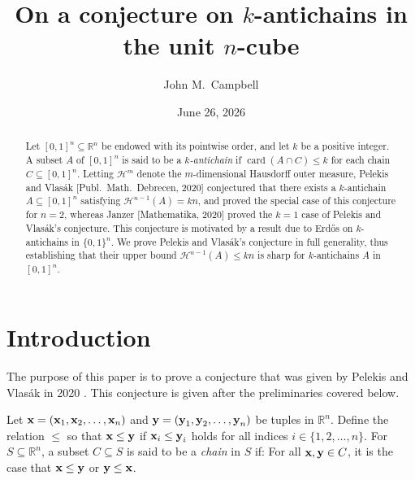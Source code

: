 \documentclass{publicadapt}
\title{On a conjecture on $k$-antichains in the unit $n$-cube}
\author{John M.\ Campbell}
\date{June 26, 2026}
\begin{document}
 \begin{abstract}
 Let $[0, 1]^{n} \subseteq \mathbb{R}^{n}$ be endowed with its pointwise order, and let $k$ be a positive integer. A subset $A$ of $[0, 1]^{n}$ is said to be a \emph{$k$-antichain} if 
 $\operatorname{card}(A \cap C) \leq k$ for each chain $C \subseteq [0, 1]^{n}$. Letting $\mathcal{H}^{m}$ denote the $m$-dimensional Hausdorff outer measure, Pelekis and Vlas\'{a}k 
 [Publ.\ Math.\ Debrecen, 2020] conjectured that there exists a $k$-antichain $A \subseteq [0, 1]^{n}$ satisfying $\mathcal{H}^{n-1}(A) = k n$, and proved the special case of this 
 conjecture for $n = 2$, whereas Janzer [Mathematika, 2020] proved the $k = 1$ case of Pelekis and Vlas\'{a}k's conjecture. This conjecture is motivated by a result due to Erd\H{o}s on 
 $k$-antichains in $\{ 0, 1 \}^{n}$. We prove Pelekis and Vlas\'{a}k's conjecture in full generality, thus establishing that their upper bound $\mathcal{H}^{n-1}(A) \leq k n$ is sharp for 
 $k$-antichains $A$ in $[0, 1]^{n}$. 
\end{abstract}

\maketitle

\section{Introduction}
 The purpose of this paper is to prove a conjecture that was given by Pelekis and Vlas\'{a}k in 2020 \cite{PelekisVlasak2020}. This conjecture is given after the preliminaries covered below. 

 Let $\text{{\bf x}} = (\text{{\bf x}}_1, \text{{\bf x}}_2, \ldots, \text{{\bf x}}_n)$ and $\text{{\bf y}} = (\text{{\bf y}}_1, \text{{\bf y}}_2, \ldots, \text{{\bf y}}_n)$ be tuples 
 in $\mathbb{R}^{n}$. Define the relation $\leq$ so that $\text{{\bf x}} \leq \text{{\bf y}}$ if $\text{{\bf x}}_i \leq \text{{\bf y}}_i$ holds for all indices $i \in \{ 1, 2, \ldots, n \}$. For 
 $S \subseteq \mathbb{R}^{n}$, a subset $C \subseteq S$ is said to be a \emph{chain} in $S$ if: For all $\text{{\bf x}}, \text{{\bf y}} \in C$, it is the 
 case that $\text{{\bf x}} \leq \text{{\bf y}}$ or $\text{{\bf y}} \leq \text{{\bf x}}$. 
\end{document}
